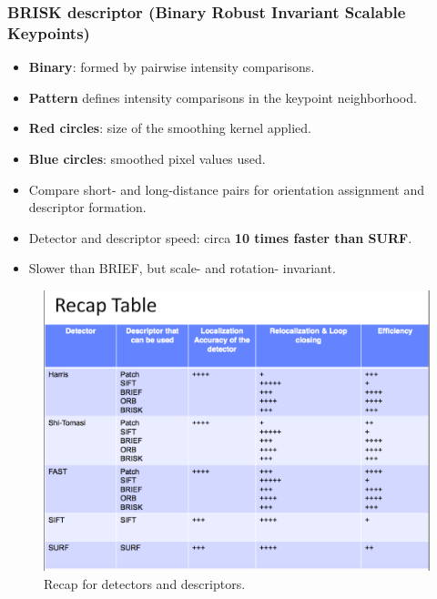 \documentclass[a4paper,12 pt]{article}
\theoremstyle{definition}
\theoremstyle{remark}
\theoremstyle{definition}
\theoremstyle{definition}
\theoremstyle{definition}
\theoremstyle{remark}
\theoremstyle{definition}
\begin{document}
\subsubsection*{BRISK descriptor (Binary Robust Invariant Scalable Keypoints)}
\begin{itemize}
\item \textbf{Binary}: formed by pairwise intensity comparisons.
\item \textbf{Pattern} defines intensity comparisons in the keypoint neighborhood.
\item \textbf{Red circles}: size of the smoothing kernel applied.
\item \textbf{Blue circles}: smoothed pixel values used.
\item Compare short- and long-distance pairs for orientation assignment and descriptor formation.
\item Detector and descriptor speed: circa \textbf{10 times faster than SURF}.
\item Slower than BRIEF, but scale- and rotation- invariant.
\end{itemize}

\begin{figure}[tbh]
\begin{center}
\includegraphics[scale=0.4]{pics/recap}
\caption{Recap for detectors and descriptors. \label{fig:recap}}
\end{center}
\end{figure}
\end{document}
